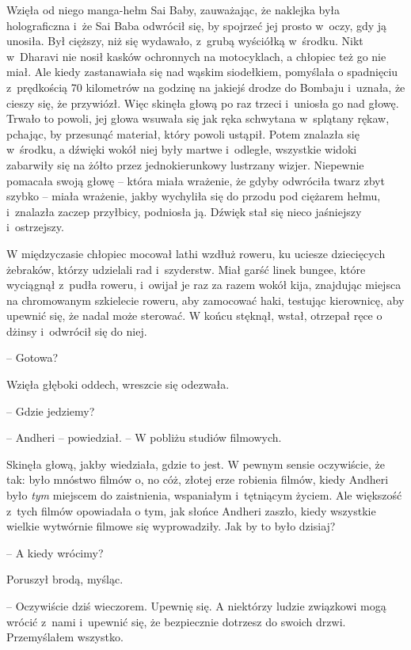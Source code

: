 \documentclass[oneside,polish,11pt,rmheadings]{mwbk}
\begin{document}
Wzięła od niego manga-hełm Sai Baby, zauważając, że naklejka była holograficzna i~że Sai Baba odwrócił się, by spojrzeć jej prosto w~oczy, gdy ją unosiła. Był cięższy, niż się wydawało, z~grubą wyściółką w~środku. Nikt w~Dharavi nie nosił kasków ochronnych na motocyklach, a chłopiec też go nie miał. Ale kiedy zastanawiała się nad wąskim siodełkiem, pomyślała o spadnięciu z~prędkością 70 kilometrów na godzinę na jakiejś drodze do Bombaju i~uznała, że cieszy się, że przywiózł. Więc skinęła głową po raz trzeci i~uniosła go nad głowę. Trwało to powoli, jej głowa wsuwała się jak ręka schwytana w~splątany rękaw, pchając, by przesunąć materiał, który powoli ustąpił. Potem znalazła się w~środku, a dźwięki wokół niej były martwe i~odległe, wszystkie widoki zabarwiły się na żółto przez jednokierunkowy lustrzany wizjer. Niepewnie pomacała swoją głowę -- która miała wrażenie, że gdyby odwróciła twarz zbyt szybko -- miała wrażenie, jakby wychyliła się do przodu pod ciężarem hełmu, i~znalazła zaczep przyłbicy, podniosła ją. Dźwięk stał się nieco jaśniejszy i~ostrzejszy.

W międzyczasie chłopiec mocował lathi wzdłuż roweru, ku uciesze dziecięcych żebraków, którzy udzielali rad i~szyderstw. Miał garść linek bungee, które wyciągnął z~pudła roweru, i~owijał je raz za razem wokół kija, znajdując miejsca na chromowanym szkielecie roweru, aby zamocować haki, testując kierownicę, aby upewnić się, że nadal może sterować. W końcu stęknął, wstał, otrzepał ręce o dżinsy i~odwrócił się do niej.

-- Gotowa? 

Wzięła głęboki oddech, wreszcie się odezwała. 

-- Gdzie jedziemy? 

-- Andheri -- powiedział. -- W pobliżu studiów filmowych.

Skinęła głową, jakby wiedziała, gdzie to jest. W pewnym sensie oczywiście, że tak: było mnóstwo filmów o, no cóż, złotej erze robienia filmów, kiedy Andheri było \textit{tym} miejscem do zaistnienia, wspaniałym i~tętniącym życiem. Ale większość z~tych filmów opowiadała o tym, jak słońce Andheri zaszło, kiedy wszystkie wielkie wytwórnie filmowe się wyprowadziły. Jak by to było dzisiaj?

-- A kiedy wrócimy?

Poruszył brodą, myśląc. 

-- Oczywiście dziś wieczorem. Upewnię się. A niektórzy ludzie związkowi mogą wrócić z~nami i~upewnić się, że bezpiecznie dotrzesz do swoich drzwi. Przemyślałem wszystko.
\end{document}
